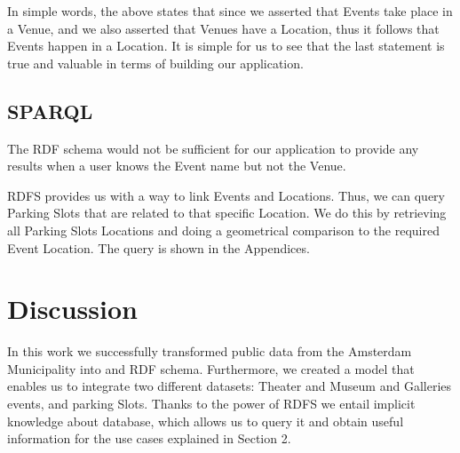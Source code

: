 \documentclass[runningheads,a4paper]{../../StyleFiles/llncs}
\begin{document}
In simple words, the above states that since we asserted that Events take place in a Venue, and we also asserted that Venues have a Location, thus it follows that Events happen in a Location. It is simple for us to see that the last statement is true and valuable in terms of building our application.


\subsection{SPARQL}
The RDF schema would not be sufficient for our application to provide any results when a user knows the Event name but not the Venue. 

RDFS provides us with a way to link Events and Locations. Thus, we can query Parking Slots that are related to that specific Location. We do this by retrieving all Parking Slots Locations and doing a geometrical comparison to the required Event Location. The query is shown in the Appendices. 



\section{Discussion}
In this work we successfully transformed public data from the Amsterdam Municipality into and RDF schema. Furthermore, we created a model that enables us to integrate two different datasets: Theater and Museum and Galleries events, and parking Slots. Thanks to the power of RDFS we entail implicit knowledge about database, which allows us to query it and obtain useful information for the use cases explained in Section 2. 
\end{document}
